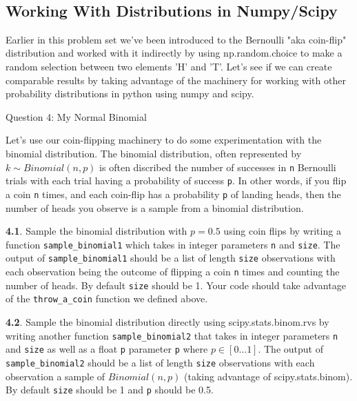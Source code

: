 \documentclass[11pt]{article}
\begin{document}
    \begin{center}
    \end{center}
    { \hspace*{\fill} \\}
    
    \subsection{Working With Distributions in
Numpy/Scipy}\label{working-with-distributions-in-numpyscipy}

Earlier in this problem set we've been introduced to the Bernoulli "aka
coin-flip" distribution and worked with it indirectly by using
np.random.choice to make a random selection between two elements 'H' and
'T'. Let's see if we can create comparable results by taking advantage
of the machinery for working with other probability distributions in
python using numpy and scipy.

     Question 4: My Normal Binomial

Let's use our coin-flipping machinery to do some experimentation with
the binomial distribution. The binomial distribution, often represented
by \(k \sim Binomial(n, p)\) is often discribed the number of successes
in \texttt{n} Bernoulli trials with each trial having a probability of
success \texttt{p}. In other words, if you flip a coin \texttt{n} times,
and each coin-flip has a probability \texttt{p} of landing heads, then
the number of heads you observe is a sample from a binomial
distribution.

\textbf{4.1}. Sample the binomial distribution with \(p = 0.5\) using
coin flips by writing a function \texttt{sample\_binomial1} which takes
in integer parameters \texttt{n} and \texttt{size}. The output of
\texttt{sample\_binomial1} should be a list of length \texttt{size}
observations with each observation being the outcome of flipping a coin
\texttt{n} times and counting the number of heads. By default
\texttt{size} should be 1. Your code should take advantage of the
\texttt{throw\_a\_coin} function we defined above.

\textbf{4.2}. Sample the binomial distribution directly using
scipy.stats.binom.rvs by writing another function
\texttt{sample\_binomial2} that takes in integer parameters \texttt{n}
and \texttt{size} as well as a float \texttt{p} parameter \texttt{p}
where \(p \in [0 \ldots 1]\). The output of \texttt{sample\_binomial2}
should be a list of length \texttt{size} observations with each
observation a sample of \(Binomial(n, p)\) (taking advantage of
scipy.stats.binom). By default \texttt{size} should be 1 and \texttt{p}
should be 0.5.
\end{document}
